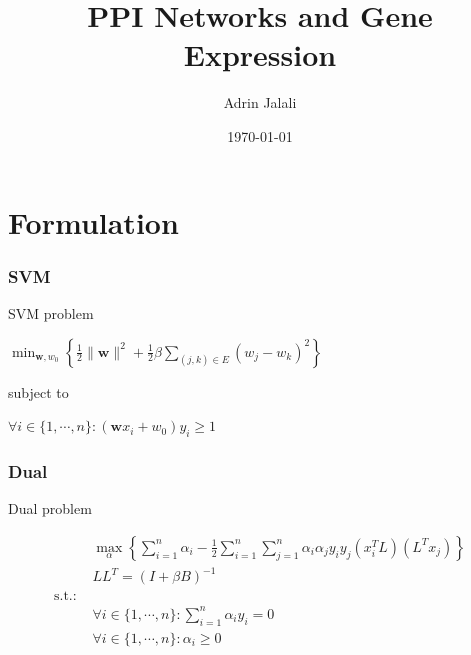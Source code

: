 \documentclass{beamer}
\begin{document}
\title{PPI Networks and Gene Expression}  
\author{Adrin Jalali}
\date{\today} 

\begin{frame}
\titlepage
\end{frame}



\section{Formulation} 
\begin{frame}
\frametitle{SVM} 

\begin{block}{SVM problem}
\begin{center}
  $\min_{\mathbf{w}, w_0}\left\{\frac{1}{2}\|\mathbf{w}\|^2 + \frac{1}{2}\beta\sum_{(j,k)\in E}(w_j-w_k)^2\right\}$
\end{center}
subject to
\begin{center}
  $\forall i \in \{1,\cdots,n\} : (\mathbf{w}x_i+w_0)y_i\geq 1$
\end{center}
\end{block}
\end{frame}

\begin{frame}
\frametitle{Dual}
\begin{block}{Dual problem}
  \begin{center}
    \begin{align*}
    &\max_\alpha\left\{\sum_{i=1}^n\alpha_i-\frac{1}{2}\sum_{i=1}^n\sum_{j=1}^n\alpha_i\alpha_j y_i y_j (x_i^TL)(L^Tx_j)\right\}\\
      &LL^T=(I+\beta B)^{-1}\\
        \text{s.t.: }&\\
        &\forall i \in \{1,\cdots,n\}: \sum_{i=1}^n\alpha_iy_i=0\\
        &\forall i \in \{1,\cdots,n\}: \alpha_i \geq 0
    \end{align*}
  \end{center}
\end{block}
\end{frame}
\end{document}
